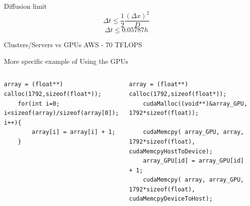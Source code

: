 \documentclass{beamer}
\begin{document}
\begin{frame}{}
\end{frame}

\begin{frame}{Diffusion limit}
    $$\Delta t \le \frac{1}{2}\frac{(\Delta x)^2}{D}$$
    $$\Delta t \le 0.05787 h$$
\end{frame}

\begin{frame}{Clusters/Servers vs GPUs}
    AWS - 70 TFLOPS
\end{frame}

\begin{frame}[fragile]{More specific example of Using the GPUs}
\vspace{0.5em}
\vspace{-3em}

\begin{columns}[T]
    \begin{center}
    \begin{lstlisting}[style=CStyle]
    array = (float**) calloc(1792,sizeof(float*));
    for(int i=0; i<sizeof(array)/sizeof(array[0]); i++){
        array[i] = array[i] + 1;
    }
    \end{lstlisting}
    \end{center}
    \begin{center}
    \begin{lstlisting}[style=CStyle]
    array = (float**) calloc(1792,sizeof(float*));
    cudaMalloc((void**)&array_GPU, 1792*sizeof(float));
    
    cudaMemcpy( array_GPU, array, 1792*sizeof(float), cudaMemcpyHostToDevice);
    array_GPU[id] = array_GPU[id] + 1;
    cudaMemcpy( array, array_GPU, 1792*sizeof(float), cudaMemcpyDeviceToHost);
    \end{lstlisting}
    \end{center}
\end{columns}
\end{frame}
\end{document}
